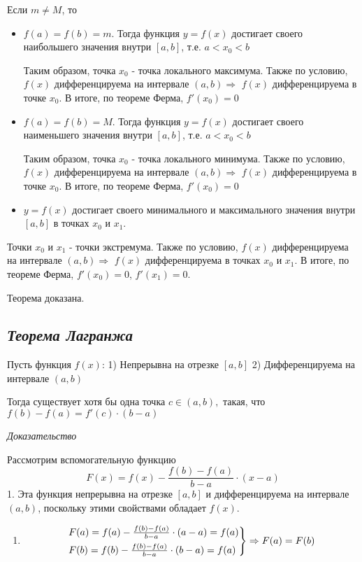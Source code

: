Если $m \neq M$, то
\begin{itemize}

\item $f(a) = f(b) = m$. Тогда функция $y = f(x)$ достигает своего наибольшего значения внутри $[a, b]$, т.е. $a < x_0 < b$

Таким образом, точка $x_0$ - точка локального максимума. Также по условию, $f(x)$ дифференцируема на интервале $(a, b) \Rightarrow$ $f(x)$ дифференцируема в точке $x_0$. В итоге, по теореме Ферма, $f'(x_0)=0$
\item $f(a) = f(b) = M$. Тогда функция $y = f(x)$ достигает своего наименьшего значения внутри $[a, b]$, т.е. $a < x_0 < b$

Таким образом, точка $x_0$ - точка локального минимума. Также по условию, $f(x)$ дифференцируема на интервале $(a, b) \Rightarrow$ $f(x)$ дифференцируема в точке $x_0$. В итоге, по теореме Ферма, $f'(x_0)=0$
\item $y = f(x)$ достигает своего минимального и максимального значения внутри $[a, b]$ в точках $x_0$ и $ x_1$.

\end{itemize}

Точки $x_0$ и $ x_1$ - точки экстремума. Также по условию, $f(x)$ дифференцируема на интервале $(a, b) \Rightarrow$ $f(x)$ дифференцируема в точках $x_0$ и $x_1$. В итоге, по теореме Ферма, $f'(x_0)=0$, $f'(x_1)=0$.

Теорема доказана.
\newpage 
\subsection{\textit{Теорема Лагранжа}}

Пусть функция $f(x)$: 1) Непрерывна на отрезке $[a, b]$ 2) Дифференцируема на интервале $(a, b)$

Тогда существует хотя бы одна точка $c \in (a, b),$ такая, что $f(b) - f(a) = f'(c)\cdot(b - a)$

\textit{Доказательство}

Рассмотрим вспомогательную функцию $$F(x) = f(x) - \frac{f(b) - f(a)}{b - a}\cdot (x - a)$$ 1. Эта функция непрерывна на отрезке $[a, b]$ и дифференцируема на интервале $(a, b)$, поскольку этими свойствами обладает $f(x)$.
\begin{enumerate}

\item $$\begin{rcases}
    F(a) =f(a) - {\Large\frac{f(b) - f(a)}{b - a}}\cdot (a - a) = f(a)\\
    F(b) = f(b) - {\Large\frac{f(b) - f(a)}{b - a}}\cdot (b - a) = f(a)
    \end{rcases} \Rightarrow F(a) = F(b)$$

\end{enumerate}


